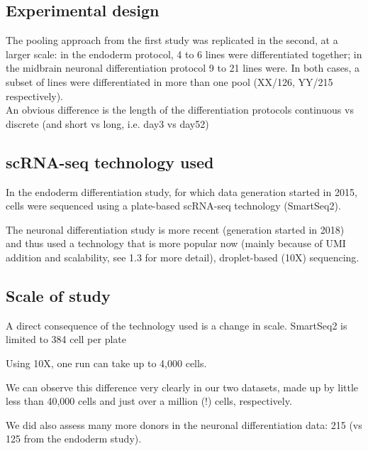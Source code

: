 \subsection{Experimental design}
The pooling approach from the first study was replicated in the second, at a larger scale: in the endoderm protocol, 4 to 6 lines were differentiated together; in the midbrain neuronal differentiation protocol 9 to 21 lines were.
In both cases, a subset of lines were differentiated in more than one pool (XX/126, YY/215 respectively).\\

An obvious difference is the length of the differentiation protocols
continuous vs discrete (and short vs long, i.e. day3 vs day52)

\subsection{scRNA-seq technology used}
In the endoderm differentiation study, for which data generation started in 2015, cells were sequenced using a plate-based scRNA-seq technology (SmartSeq2).

The neuronal differentiation study is more recent (generation started in 2018) and thus used a technology that is more popular now (mainly because of UMI addition and scalability, see 1.3 for more detail), droplet-based (10X) sequencing.

\subsection{Scale of study}
A direct consequence of the technology used is a change in scale.
SmartSeq2 is limited to 384 cell per plate

Using 10X, one run can take up to 4,000 cells.

We can observe this difference very clearly in our two datasets, made up by little less than 40,000 cells and just over a million (!) cells, respectively.

We did also assess many more donors in the neuronal differentiation data: 215 (vs 125 from the endoderm study).



